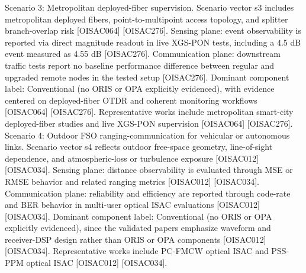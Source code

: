 {}Scenario 3: Metropolitan deployed-fiber supervision.\markdownRendererHardLineBreak
{}Scenario vector s3 includes metropolitan deployed fibers, point-to-multipoint access topology, and splitter branch-overlap risk [O\markdownRendererUnderscore{}ISAC\markdownRendererUnderscore{}064] [O\markdownRendererUnderscore{}ISAC\markdownRendererUnderscore{}276]. Sensing plane: event observability is reported via direct magnitude readout in live XGS-PON tests, including a 4.5 dB event measured as 4.55 dB [O\markdownRendererUnderscore{}ISAC\markdownRendererUnderscore{}276]. Communication plane: downstream traffic tests report no baseline performance difference between regular and upgraded remote nodes in the tested setup [O\markdownRendererUnderscore{}ISAC\markdownRendererUnderscore{}276]. Dominant component label: Conventional (no ORIS or OPA explicitly evidenced), with evidence centered on deployed-fiber OTDR and coherent monitoring workflows [O\markdownRendererUnderscore{}ISAC\markdownRendererUnderscore{}064] [O\markdownRendererUnderscore{}ISAC\markdownRendererUnderscore{}276]. Representative works include metropolitan smart-city deployed-fiber studies and live XGS-PON supervision [O\markdownRendererUnderscore{}ISAC\markdownRendererUnderscore{}064] [O\markdownRendererUnderscore{}ISAC\markdownRendererUnderscore{}276].\markdownRendererParagraphSeparator
{}Scenario 4: Outdoor FSO ranging-communication for vehicular or autonomous links.\markdownRendererHardLineBreak
{}Scenario vector s4 reflects outdoor free-space geometry, line-of-sight dependence, and atmospheric-loss or turbulence exposure [O\markdownRendererUnderscore{}ISAC\markdownRendererUnderscore{}012] [O\markdownRendererUnderscore{}ISAC\markdownRendererUnderscore{}034]. Sensing plane: distance observability is evaluated through MSE or RMSE behavior and related ranging metrics [O\markdownRendererUnderscore{}ISAC\markdownRendererUnderscore{}012] [O\markdownRendererUnderscore{}ISAC\markdownRendererUnderscore{}034]. Communication plane: reliability and efficiency are reported through code-rate and BER behavior in multi-user optical ISAC evaluations [O\markdownRendererUnderscore{}ISAC\markdownRendererUnderscore{}012] [O\markdownRendererUnderscore{}ISAC\markdownRendererUnderscore{}034]. Dominant component label: Conventional (no ORIS or OPA explicitly evidenced), since the validated papers emphasize waveform and receiver-DSP design rather than ORIS or OPA components [O\markdownRendererUnderscore{}ISAC\markdownRendererUnderscore{}012] [O\markdownRendererUnderscore{}ISAC\markdownRendererUnderscore{}034]. Representative works include PC-FMCW optical ISAC and PSS-PPM optical ISAC [O\markdownRendererUnderscore{}ISAC\markdownRendererUnderscore{}012] [O\markdownRendererUnderscore{}ISAC\markdownRendererUnderscore{}034].\markdownRendererInterblockSeparator

